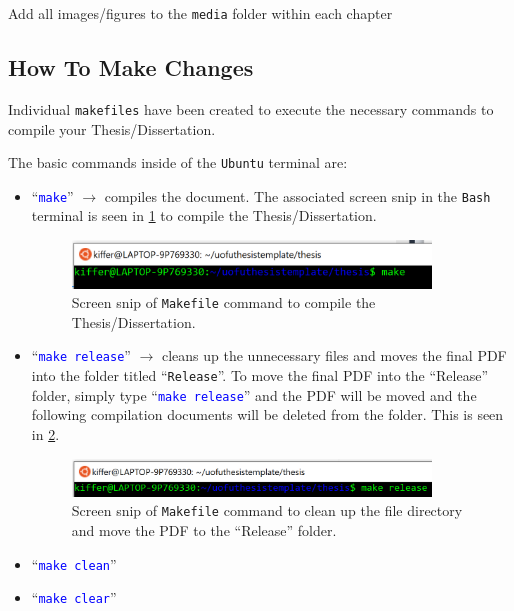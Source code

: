 \documentclass[../Dissertation]{subfiles}
\begin{document}
    Add all images/figures to the \texttt{media} folder within each chapter
    
\subsection{How To Make Changes}
    Individual \texttt{makefiles} have been created to execute the
    necessary commands to compile your Thesis/Dissertation.
    
    The basic commands inside of the \texttt{Ubuntu} terminal are:  
    \begin{itemize}
        \setlength\itemsep{0em}
        \item ``\textcolor{blue}{\texttt{make}}'' $\longrightarrow$
            compiles the document.  The associated screen snip in the
            \texttt{Bash} terminal is seen in \cref{fig:LinuxMakeDissertation}
            to compile the Thesis/Dissertation.
        \begin{figure}
            \centering
            \includegraphics[width=0.9\textwidth]
            {./LinuxMakeDissertation}
            \caption{Screen snip of \texttt{Makefile} command to compile the 
            Thesis/Dissertation.}
            \label{fig:LinuxMakeDissertation}
        \end{figure}
        \item ``\textcolor{blue}{\texttt{make release}}''
            $\longrightarrow$ cleans up the unnecessary files and moves the
            final PDF into the folder titled ``\texttt{Release}''.  To move the
            final PDF into the ``Release'' folder, simply type
            ``\textcolor{blue}{\texttt{make release}}'' and the PDF
            will be moved and the following  compilation
            documents will be deleted from the folder.  This is seen in
            \cref{fig:LinuxMakeRelease}.
            \begin{figure}
                \centering
                \includegraphics[width=0.9\textwidth]
                {./LinuxMakeRelease}
                \caption{Screen snip of \texttt{Makefile} command to clean up
                the file directory and move the PDF to the ``Release'' folder.}
                \label{fig:LinuxMakeRelease}
            \end{figure}
        \item ``\textcolor{blue}{\texttt{make clean}}''
        \item ``\textcolor{blue}{\texttt{make clear}}''
    \end{itemize}
\end{document}
